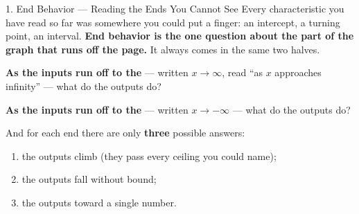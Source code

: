 \documentclass[10pt]{article}
\begin{document}
\boxguard[30]
\begin{notesbox}{1. End Behavior --- Reading the Ends You Cannot See}
\small
Every characteristic you have read so far was somewhere you could put a finger: an intercept, a
turning point, an interval. \textbf{End behavior is the one question about the part of the graph that
runs off the page.} It always comes in the same two halves.

\vspace{4pt}
\textbf{As the inputs run off to the } --- written $x \to \infty$, read ``as $x$
approaches infinity'' --- what do the outputs do?

\vspace{2pt}
\textbf{As the inputs run off to the } --- written $x \to -\infty$ --- what do the
outputs do?

\vspace{4pt}
And for each end there are only \textbf{three} possible answers:
\begin{enumerate}[leftmargin=1.5em, itemsep=1pt, topsep=3pt]
  \item the outputs climb  (they pass every ceiling you could name);
  \item the outputs fall without bound;
  \item the outputs  toward a single number.
\end{enumerate}


\end{notesbox}
\end{document}
